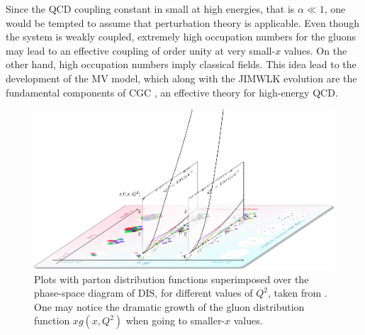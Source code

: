 Since the {\sffamily QCD} coupling constant in small at high energies, that is $\alpha \ll 1$, one would be tempted to assume that perturbation theory is applicable. Even though the system is weakly coupled, extremely high occupation numbers for the gluons may lead to an effective coupling of order unity at very small-$x$ values. On the other hand, high occupation numbers imply classical fields. This idea lead to the development \cite{mclerven1, mclerven2, mclerven3} of the {\sffamily MV} model, which along with the {\sffamily JIMWLK} evolution \cite{JalilianMarian:1997dw} are the fundamental components of {\sffamily CGC} \cite{iancunonlinear, Ferreiro:2001qy}, an effective theory for high-energy {\sffamily QCD}.

\begin{figure}[!hbt]
	\centering
    \includegraphics[width=\textwidth]{images/xq2diagram-pdfs.png}
    \caption{\normalsize Plots with parton distribution functions superimposed over the phase-space diagram of {\sffamily DIS}, for different values of $Q^2$, taken from \cite{xq2diagrams}. One may notice the dramatic growth of the gluon distribution function $xg(x,Q^2)$ when going to smaller-$x$ values.}
\end{figure}

